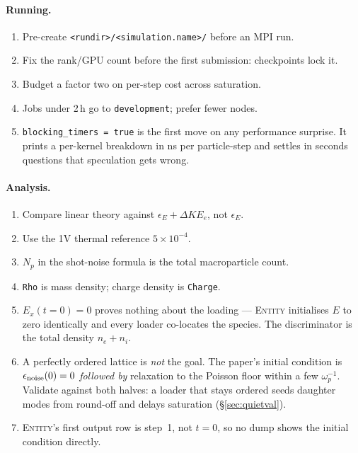 \documentclass[11pt,a4paper]{article}
\newcommand{\code}[1]{\texttt{\small #1}}
\begin{document}
\paragraph{Running.}
\begin{enumerate}
  \item Pre-create \code{<rundir>/<simulation.name>/} before an MPI run.
  \item Fix the rank/GPU count before the first submission: checkpoints lock it.
  \item Budget a factor two on per-step cost across saturation.
  \item Jobs under 2\,h go to \code{development}; prefer fewer nodes.
  \item \code{blocking\_timers = true} is the first move on any performance surprise.
        It prints a per-kernel breakdown in ns per particle-step and settles in
        seconds questions that speculation gets wrong.
\end{enumerate}

\paragraph{Analysis.}
\begin{enumerate}
  \item Compare linear theory against $\epsilon_E + \Delta KE_e$, not $\epsilon_E$.
  \item Use the 1V thermal reference $5\times10^{-4}$.
  \item $N_p$ in the shot-noise formula is the total macroparticle count.
  \item \code{Rho} is mass density; charge density is \code{Charge}.
  \item $E_x(t{=}0) = 0$ proves nothing about the loading --- \textsc{Entity}
        initialises $E$ to zero identically and every loader co-locates the species.
        The discriminator is the total density $n_e + n_i$.
  \item A perfectly ordered lattice is \emph{not} the goal. The paper's initial
        condition is $\epsilon_{\rm noise}(0)=0$ \emph{followed by} relaxation to the
        Poisson floor within a few $\omega_p^{-1}$. Validate against both halves: a
        loader that stays ordered seeds daughter modes from round-off and delays
        saturation (\S\ref{sec:quietval}).
  \item \textsc{Entity}'s first output row is step~1, not $t=0$, so no dump shows the
        initial condition directly.
\end{enumerate}
\end{document}

